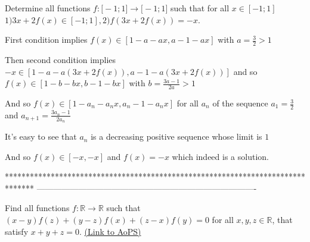 \begin{solution}
	\begin{tcolorbox}Determine all functions $f: \mathbb[-1;1]\to\mathbb[-1;1]$ such that for all $x\in[-1;1]$
$1)3x+2f(x)\in[-1;1] ,2)f(3x+2f(x))=-x$.\end{tcolorbox}
First condition implies $f(x)\in[1-a-ax,a-1-ax]$ with $a=\frac 32>1$

Then second condition implies $-x\in[1-a-a(3x+2f(x)),a-1-a(3x+2f(x))]$ and so $f(x)\in[1-b-bx,b-1-bx]$ with $b=\frac {3a-1}{2a}>1$

And so $f(x)\in[1-a_n-a_nx,a_n-1-a_nx]$ for all $a_n$ of the sequence $a_1=\frac 32$ and $a_{n+1}=\frac {3a_n-1}{2a_n}$

It's easy to see that $a_n$ is a decreasing positive sequence whose limit is $1$

And so $f(x)\in[-x,-x]$ and $\boxed{f(x)=-x}$ which indeed is a solution.
\end{solution}
*******************************************************************************
-------------------------------------------------------------------------------

\begin{problem}
	Find all functions $f : \mathbb{R} \to \mathbb{R}$ such that $(x-y)f(z)+(y-z)f(x)+(z-x)f(y) = 0$ for all $x,y,z\in\mathbb{R}$, that satisfy $x+y+z=0.$
	\flushright \href{https://artofproblemsolving.com/community/c6h490152}{(Link to AoPS)}
\end{problem}



